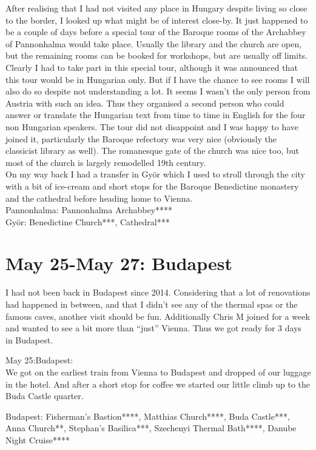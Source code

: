 After realising that I had not visited any place in Hungary despite living so close to the border, I looked up what might be of interest close-by. It just happened to be a couple of days before a special tour of the Baroque rooms of the Archabbey of Pannonhalma would take place. Usually the library and the church are open, but the remaining rooms can be booked for workshops, but are usually off limits. Clearly I had to take part in this special tour, although it was announced that this tour would be in Hungarian only. But if I have the chance to see rooms I will also do so despite not understanding a lot. It seems I wasn't the only person from Austria with such an idea. Thus they organised a second person who could answer or translate the Hungarian text from time to time in English for the four non Hungarian speakers. The tour did not disappoint and I was happy to have joined it, particularly the Baroque refectory was very nice (obviously the classicist library as well). The romanesque gate of the church was nice too, but most of the church is largely remodelled 19th century. \\
On my way back I had a transfer in Gy\"or which I used to stroll through the city with a bit of ice-cream and short stops for the Baroque Benedictine monastery and the cathedral before heading home to Vienna.\\ 

Pannonhalma: Pannonhalma Archabbey****\\
Gy\"or: Benedictine Church***, Cathedral***\\

\section{May 25-May 27: Budapest}
\label{2022:BudapestI}

I had not been back in Budapest since 2014. Considering that a lot of renovations had happened in between, and that I didn't see any of the thermal spas or the famous caves, another visit should be fun. Additionally Chris M joined for a week and wanted to see a bit more than ``just'' Vienna. Thus we got ready for 3 days in Budapest.

May 25:Budapest:\\
We got on the earliest train from Vienna to Budapest and dropped of our luggage in the hotel. And after a short stop for coffee we started our little climb up to the Buda Castle quarter.

Budapest: Fisherman's Bastion****, Matthias Church****, Buda Castle***, Anna Church**, Stephan's Basilica***, Szechenyi Thermal Bath****, Danube Night Cruise****\\

